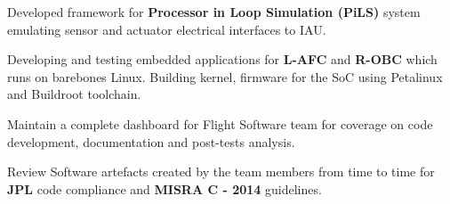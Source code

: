 \begin{cventries}
{\begin{cvitems}
			\item{Developed framework for \textbf{Processor in Loop Simulation (PiLS)} system emulating sensor and actuator electrical interfaces to IAU.}
			\item{Developing and testing embedded applications for \textbf{L-AFC} and \textbf{R-OBC} which runs on barebones Linux. Building kernel, firmware for the SoC using Petalinux and Buildroot toolchain.}
			\item{Maintain a complete dashboard for Flight Software team for coverage on code development, documentation and post-tests analysis.}
			\item{Review Software artefacts created by the team members from time to time for \textbf{JPL} code compliance and \textbf{MISRA C - 2014} guidelines.}
		\end{cvitems}
	}
\end{cventries}
